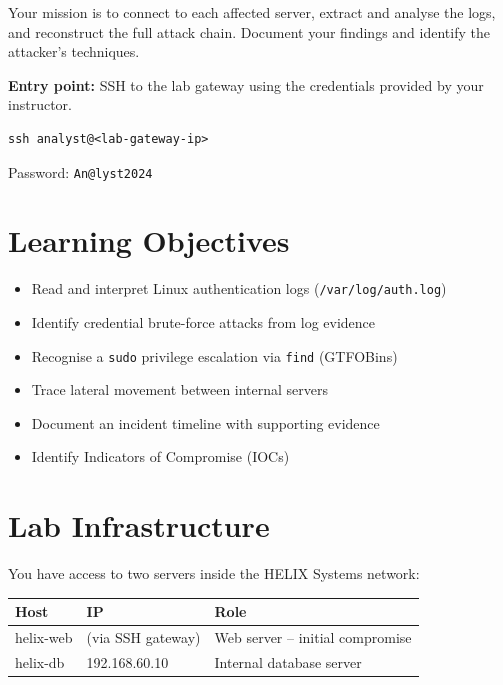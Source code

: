 \documentclass[a4paper, 12pt]{article}
\begin{document}
Your mission is to connect to each affected server, extract and analyse the logs, and
reconstruct the full attack chain. Document your findings and identify the attacker's
techniques.

\begin{mdframed}[backgroundcolor=labgray]
\textbf{Entry point:} SSH to the lab gateway using the credentials provided by your instructor.
\begin{lstlisting}
ssh analyst@<lab-gateway-ip>
\end{lstlisting}
Password: \texttt{An@lyst2024}
\end{mdframed}

\section{Learning Objectives}

\begin{itemize}
    \item Read and interpret Linux authentication logs (\texttt{/var/log/auth.log})
    \item Identify credential brute-force attacks from log evidence
    \item Recognise a \texttt{sudo} privilege escalation via \texttt{find} (GTFOBins)
    \item Trace lateral movement between internal servers
    \item Document an incident timeline with supporting evidence
    \item Identify Indicators of Compromise (IOCs)
\end{itemize}

\section{Lab Infrastructure}

You have access to two servers inside the HELIX Systems network:

\begin{center}
\begin{tabular}{lll}
\toprule
\textbf{Host} & \textbf{IP} & \textbf{Role} \\
\midrule
helix-web & (via SSH gateway) & Web server -- initial compromise \\
helix-db  & 192.168.60.10     & Internal database server \\
\bottomrule
\end{tabular}
\end{center}
\end{document}
